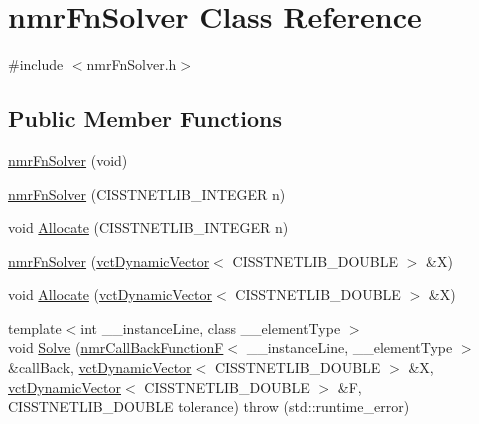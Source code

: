 \hypertarget{classnmr_fn_solver}{\section{nmr\-Fn\-Solver Class Reference}
\label{classnmr_fn_solver}
}


{\ttfamily \#include $<$nmr\-Fn\-Solver.\-h$>$}

\subsection*{Public Member Functions}
\begin{DoxyCompactItemize}
\item 
\hyperlink{classnmr_fn_solver_aca0794b0654a30e4537bffa1ce54a488}{nmr\-Fn\-Solver} (void)
\item 
\hyperlink{classnmr_fn_solver_af918d360bf62e8ee3890847a1bf7060b}{nmr\-Fn\-Solver} (C\-I\-S\-S\-T\-N\-E\-T\-L\-I\-B\-\_\-\-I\-N\-T\-E\-G\-E\-R n)
\item 
void \hyperlink{classnmr_fn_solver_a81c97291fdaf4b1afa5fe04039834e31}{Allocate} (C\-I\-S\-S\-T\-N\-E\-T\-L\-I\-B\-\_\-\-I\-N\-T\-E\-G\-E\-R n)
\end{DoxyCompactItemize}
{\bf }\par
\begin{DoxyCompactItemize}
\item 
\hyperlink{classnmr_fn_solver_a4cde18dd0f3d11272a0991c75ba87407}{nmr\-Fn\-Solver} (\hyperlink{classvct_dynamic_vector}{vct\-Dynamic\-Vector}$<$ C\-I\-S\-S\-T\-N\-E\-T\-L\-I\-B\-\_\-\-D\-O\-U\-B\-L\-E $>$ \&X)
\end{DoxyCompactItemize}

{\bf }\par
\begin{DoxyCompactItemize}
\item 
void \hyperlink{classnmr_fn_solver_afef5f3c1b9b57846759ed375dca30637}{Allocate} (\hyperlink{classvct_dynamic_vector}{vct\-Dynamic\-Vector}$<$ C\-I\-S\-S\-T\-N\-E\-T\-L\-I\-B\-\_\-\-D\-O\-U\-B\-L\-E $>$ \&X)
\end{DoxyCompactItemize}

{\bf }\par
\begin{DoxyCompactItemize}
\item 
{\footnotesize template$<$int \-\_\-\-\_\-instance\-Line, class \-\_\-\-\_\-element\-Type $>$ }\\void \hyperlink{classnmr_fn_solver_aa11bd4b3ac560b2be8fa8c6ec1fd1f99}{Solve} (\hyperlink{classnmr_call_back_function_f}{nmr\-Call\-Back\-Function\-F}$<$ \-\_\-\-\_\-instance\-Line, \-\_\-\-\_\-element\-Type $>$ \&call\-Back, \hyperlink{classvct_dynamic_vector}{vct\-Dynamic\-Vector}$<$ C\-I\-S\-S\-T\-N\-E\-T\-L\-I\-B\-\_\-\-D\-O\-U\-B\-L\-E $>$ \&X, \hyperlink{classvct_dynamic_vector}{vct\-Dynamic\-Vector}$<$ C\-I\-S\-S\-T\-N\-E\-T\-L\-I\-B\-\_\-\-D\-O\-U\-B\-L\-E $>$ \&F, C\-I\-S\-S\-T\-N\-E\-T\-L\-I\-B\-\_\-\-D\-O\-U\-B\-L\-E tolerance)  throw (std\-::runtime\-\_\-error)
\end{DoxyCompactItemize}

